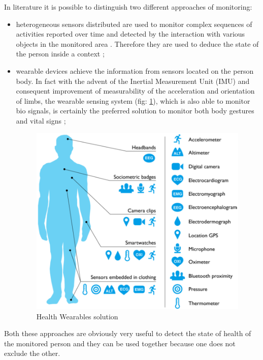 \documentclass{thesisreport}
\begin{document}
 In literature it is possible to distinguish two different approaches of monitoring: 
 \begin{itemize}
    \item heterogeneous sensors distributed are used to monitor complex sequences of activities reported over time and detected by the interaction with various objects in the monitored area \cite{scalmato2012describing}. Therefore they are used to deduce the state of the person inside a context \cite{aggarwal2011human};
    \item wearable devices achieve the information from sensors located on the person body. In fact with the advent of the Inertial Measurement Unit (IMU) and consequent improvement of measurability of the acceleration and orientation of limbs, the wearable sensing system (fig: \ref{fig:Wearables}), which is also able to monitor bio signals, is certainly the preferred solution to monitor both body gestures and vital signs \cite{bruno2013analysis};
 
    \begin{figure}
		\centering
		\includegraphics[width=10.5cm]{Thesis/data/sensoring.png}
		\caption{Health Wearables solution \cite{Wearables2016rise}}
		\label{fig:Wearables}
	\end{figure}
	
\end{itemize}
Both these approaches are obviously very useful to detect the state of health of the monitored person and they can be used together because one does not exclude the other. 
\end{document}
